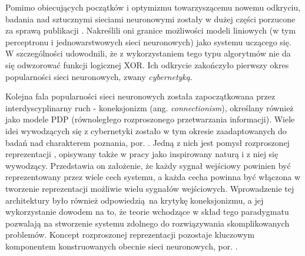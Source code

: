 \documentclass[12pt,a4paper,twoside]{article}
\begin{document}
Pomimo obiecujących początków i optymizmu towarzyszącemu nowemu odkryciu, badania nad sztucznymi sieciami neuronowymi zostały w dużej części porzucone za sprawą publikacji \citet{minsky1969}. Nakreślili oni granice możliwości modeli liniowych (w tym perceptronu i jednowarstwowych sieci neuronowych) jako systemu uczącego się. W szczególności udowodnili, że z wykorzystaniem tego typu algorytmów nie da się odwzorować funkcji logicznej XOR. Ich odkrycie zakończyło pierwszy okres popularności sieci neuronowych, zwany \textit{cybernetyką}.

Kolejna fala popularności sieci neuronowych została zapoczątkowana przez interdyscyplinarny ruch - koneksjonizm (ang. \textit{connectionism}), określany również jako modele PDP (równoległego rozproszonego przetwarzania informacji). Wiele idei wywodzących się z cybernetyki zostało w tym okresie zaadaptowanych do badań nad charakterem poznania, por. \citet{touretzky1985}. Jedną z nich jest pomysł rozproszonej reprezentacji \citep{hinton1986}, opisywany także w pracy \citet{touretzky1985} jako inspirowany naturą i z niej się wywodzący. Przedstawia on założenie, że każdy sygnał wejściowy powinien być reprezentowany przez wiele cech systemu, a każda cecha powinna być włączona w tworzenie reprezentacji możliwie wielu sygnałów wejściowych. Wprowadzenie tej architektury było również odpowiedzią na krytykę koneksjonizmu, a jej wykorzystanie dowodem na to, że teorie wchodzące w skład tego paradygmatu pozwalają na stworzenie systemu zdolnego do rozwiązywania skomplikowanych problemów. Koncept rozproszonej reprezentacji pozostaje kluczowym komponentem konstruowanych obecnie sieci neuronowych, por. \citet{goodfellow2016}.
\end{document}

